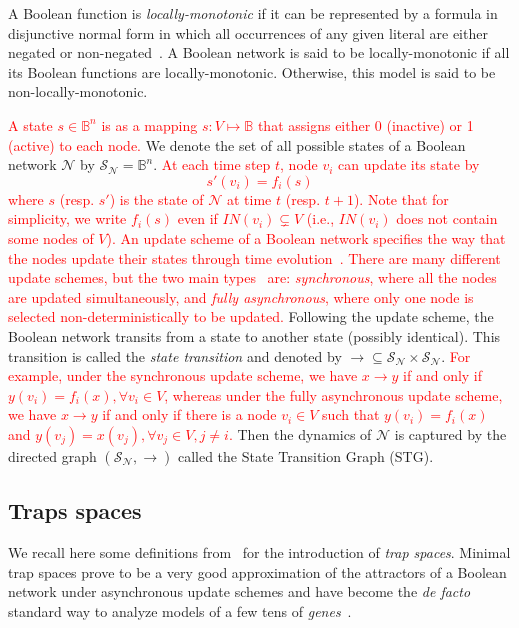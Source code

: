 \documentclass[preprint,12pt]{elsarticle}
\newcommand{\change}[1]{\textcolor{red}{#1}}
\newcommand{\IN}{\mathit{IN}}
\begin{document}
A Boolean function is \emph{locally-monotonic} if it can be represented by a formula in disjunctive normal form in which all occurrences of any given literal are either negated or non-negated~\cite{Paulev2020}.
A Boolean network is said to be locally-monotonic if all its Boolean functions are locally-monotonic.
Otherwise, this model is said to be non-locally-monotonic.

\change{A state \(s \in \mathbb{B}^{n}\) is as a mapping \(s \colon V \mapsto \mathbb{B}\) that assigns either 0 (inactive) or 1 (active) to each node.}
We denote the set of all possible states of a Boolean network \(\mathcal{N}\) by \(\mathcal{S}_{\mathcal{N}} = \mathbb{B}^n\).
\change{At each time step \(t\), node \(v_i\) can update its state by
\[s'(v_i) = f_i(s)
\]
where \(s\) (resp. \(s'\)) is the state of \(\mathcal{N}\) at time \(t\) (resp. \(t + 1\)).
Note that for simplicity, we write \(f_i(s)\) even if \(\IN(v_i) \subsetneq V\) (i.e., \(\IN(v_i)\) does not contain some nodes of \(V\)).
An update scheme of a Boolean network specifies the way that the nodes update their states through time evolution~\cite{gershenson2004introduction}.
There are many different update schemes, but the two main types~\cite{gershenson2004introduction} are: \emph{synchronous}, where all the nodes are \change{updated} simultaneously, and \emph{fully asynchronous}, where only one node is selected non-deterministically to be updated.}
Following the update scheme, the Boolean network transits from a state to another state (possibly identical).
This transition is called the \emph{state transition} and denoted by \(\rightarrow \subseteq \mathcal{S}_{\mathcal{N}} \times \mathcal{S}_{\mathcal{N}}\).
\change{For example, under the synchronous update scheme, we have \(x \rightarrow y\) if and only if \(y(v_i) = f_i(x), \forall v_i \in V\), whereas under the fully asynchronous update scheme, we have \(x \rightarrow y\) if and only if there is a node \(v_i \in V\) such that \(y(v_i) = f_i(x)\) and \(y(v_j) = x(v_j), \forall v_j \in V, j \neq i\).}
Then the dynamics of \(\mathcal{N}\) is captured by the directed graph \((\mathcal{S}_{\mathcal{N}}, \rightarrow)\) called the State Transition Graph (STG).

\subsection{Traps spaces}

We recall here some definitions from~\cite{klarner2015computing} for the introduction of \emph{trap spaces}.
Minimal trap spaces prove to be a very good approximation of the attractors of a Boolean network under asynchronous update schemes and have become the \emph{de facto} standard way to analyze models of a few tens of \emph{genes}~\cite{klarner2017pyboolnet,cifuentes2020control}.
\end{document}
